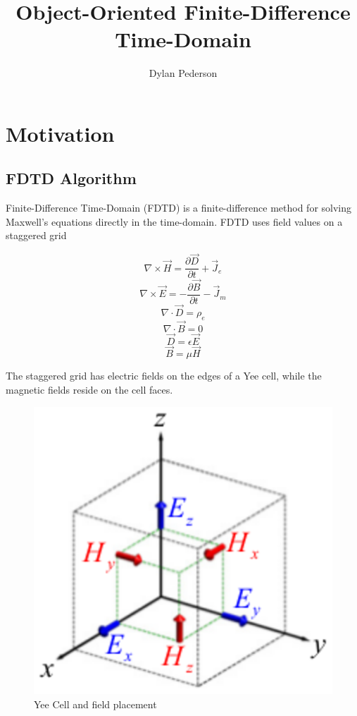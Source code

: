 \documentclass{article}
\begin{document}
\title{Object-Oriented Finite-Difference Time-Domain}
\author{Dylan Pederson}

\maketitle

\section{Motivation}

\subsection{FDTD Algorithm}

Finite-Difference Time-Domain (FDTD) is a finite-difference method for solving Maxwell's equations directly in the time-domain. FDTD uses field values on a staggered grid 

	$$\nabla \times \vec{H} = \frac{\partial \vec{D}}{\partial t} + \vec{J}_e$$
	$$\nabla \times \vec{E} = -\frac{\partial \vec{B}}{\partial t} - \vec{J}_m$$ 
	$$\nabla \cdot \vec{D} = \rho_e $$ 
	$$\nabla \cdot \vec{B} = 0$$
	$$\vec{D} = \epsilon \vec{E} $$
    $$\vec{B} = \mu \vec{H} $$

The staggered grid has electric fields on the edges of a Yee cell, while the magnetic fields reside on the cell faces.

\begin{figure}[h]
\centering
\includegraphics[scale=0.5]{figs/Yee_Grid3.eps}
\caption{Yee Cell and field placement}
\end{figure}
\end{document}
